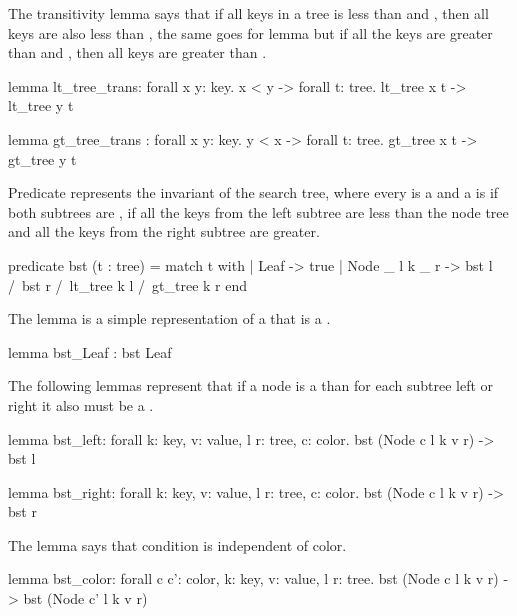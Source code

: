 The transitivity lemma  says that if all keys in a tree is less than  and , then all
keys are also less than , the same goes for lemma  but if all the keys are greater than 
and , then all keys are greater than .

\begin{whylang}
    lemma lt_tree_trans:
        forall x y: key. x < y -> forall t: tree. lt_tree x t -> lt_tree y t

    lemma gt_tree_trans :
        forall x y: key. y < x -> forall t: tree. gt_tree x t -> gt_tree y t
\end{whylang}

Predicate  represents the invariant of the search tree, where every  is a  and
a  is  if both subtrees are , if all the keys from the left subtree are less than the
node tree and all the keys from the right subtree are greater.

\begin{whylang}
    predicate bst (t : tree) =
        match t with
        | Leaf -> true
        | Node _ l k _ r -> bst l /\ bst r /\ lt_tree k l /\ gt_tree k r
        end
\end{whylang}

The lemma  is a simple representation of a  that is a .

\begin{whylang}
    lemma bst_Leaf : bst Leaf
\end{whylang}

The following lemmas represent that if a node is a  than for each subtree left or right it also must be a .

\begin{whylang}
    lemma bst_left:
        forall k: key, v: value, l r: tree, c: color. bst (Node c l k v r) -> bst l

    lemma bst_right:
        forall k: key, v: value, l r: tree, c: color. bst (Node c l k v r) -> bst r
\end{whylang}

The lemma  says that  condition is independent of color.

\begin{whylang}
    lemma bst_color:
        forall c c': color, k: key, v: value, l r: tree.
        bst (Node c l k v r) -> bst (Node c' l k v r)
\end{whylang}

